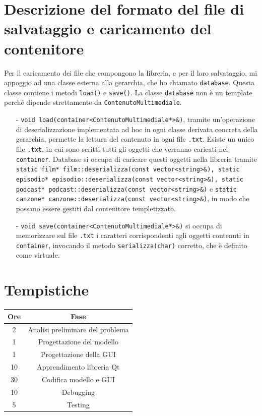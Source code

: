 \documentclass[a4paper,10pt]{article}
\begin{document}
\section{Descrizione del formato del file di salvataggio e caricamento del contenitore}
Per il caricamento dei file che compongono la libreria, e per il loro salvataggio, mi appoggio ad una classe esterna alla gerarchia, che ho chiamato \texttt{database}. Questa classe contiene i metodi \texttt{load()} e \texttt{save()}. La classe \texttt{database} non è un template perché dipende strettamente da \texttt{ContenutoMultimediale}. 
\begin{enumerate}
\item[-] \texttt{void load(container<ContenutoMultimediale*>\&)}, tramite un'operazione di deserializzazione implementata ad hoc in ogni classe derivata concreta della gerarchia, permette la lettura del contenuto in ogni file \texttt{.txt}. Esiste un unico file \texttt{.txt}, in cui sono scritti tutti gli oggetti che verranno caricati nel \texttt{container}.  Database si occupa di caricare questi oggetti nella libreria tramite \texttt{static film* film::deserializza(const vector<string>\&), static episodio* episodio::deserializza(const vector<string>\&), static podcast* podcast::deserializza(const vector<string>\&)} e \texttt{static canzone* canzone::deserializza(const vector<string>\&)}, in modo che possano essere gestiti dal contenitore templetizzato.
\item[-] \texttt{void save(container<ContenutoMultimediale*>\&)} si occupa di memorizzare sul file \texttt{.txt} i caratteri corrispondenti agli oggetti contenuti in \texttt{container}, invocando il metodo \texttt{serializza(char)} corretto, che è definito come virtuale.
\end{enumerate}

\section{Tempistiche}

\begin{center}
 \begin{tabular}{||c | c ||} 
 \hline
 \textbf{Ore} & \textbf{Fase}  \\ 
 \hline\hline
 2 & Analisi preliminare del problema \\ 
 \hline
 1 & Progettazione del modello \\
 \hline
 1 & Progettazione della GUI\\
 \hline
 10 & Apprendimento libreria Qt \\
 \hline
 30 & Codifica modello e GUI\\ 
 \hline
 10 & Debugging \\
 \hline
 5 & Testing\\
 \hline
\end{tabular}
\end{center}
\end{document}
